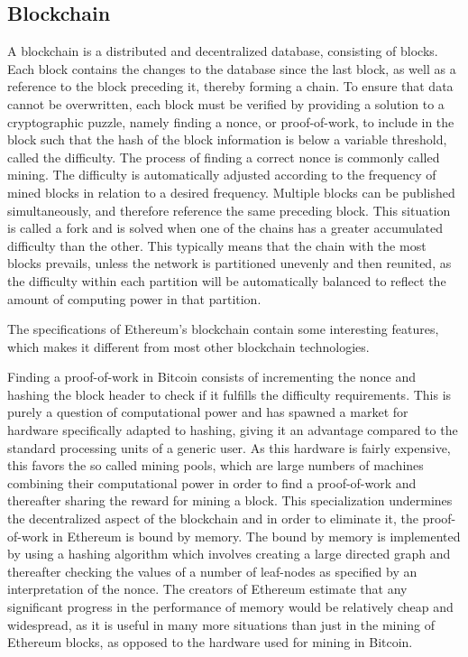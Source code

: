 \documentclass{article}
\begin{document}
		\subsection{Blockchain}
		\label{sec:blockchain}
		A blockchain is a distributed and decentralized database, consisting of blocks\cite{bitcoin-white-paper}. 
		Each block contains the changes to the database since the last block, as well as a reference to the block preceding it, thereby forming a chain.
		To ensure that data cannot be overwritten, each block must be verified by providing a solution to a cryptographic puzzle, namely finding a nonce, or proof-of-work, to include in the block such that the hash of the block information is below a variable threshold, called the difficulty\cite{bitcoin-white-paper}. 
		The process of finding a correct nonce is commonly called mining.
		The difficulty is automatically adjusted according to the frequency of mined blocks in relation to a desired frequency.
		Multiple blocks can be published simultaneously, and therefore reference the same preceding block. This situation is called a fork and is solved when one of the chains has a greater accumulated difficulty than the other.
		This typically means that the chain with the most blocks prevails, unless the network is partitioned unevenly and then reunited, as the difficulty within each partition will be automatically balanced to reflect the amount of computing power in that partition.

		The specifications of Ethereum's blockchain\cite{yellow-paper, ethereum-white-paper} contain some interesting features, which makes it different from most other blockchain technologies.
		
		Finding a proof-of-work in Bitcoin consists of incrementing the nonce and hashing the block header to check if it fulfills the difficulty requirements. 
		This is purely a question of computational power and has spawned a market for hardware specifically adapted to hashing, giving it an advantage compared to the standard processing units of a generic user. 
		As this hardware is fairly expensive, this favors the so called mining pools, which are large numbers of machines combining their computational power in order to find a proof-of-work and thereafter sharing the reward for mining a block. 
		This specialization undermines the decentralized aspect of the blockchain and in order to eliminate it, the proof-of-work in Ethereum is bound by memory.
		The bound by memory is implemented by using a hashing algorithm which involves creating a large directed graph and thereafter checking the values of a number of leaf-nodes as specified by an interpretation of the nonce. 
		The creators of Ethereum estimate that any significant progress in the performance of memory would be relatively cheap and widespread, as it is useful in many more situations than just in the mining of Ethereum blocks, as opposed to the hardware used for mining in Bitcoin.
\end{document}

